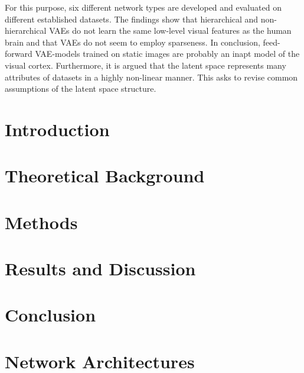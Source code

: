 \documentclass[11pt,a4paper]{article}
\let\oldsection\section
\renewcommand\section{\clearpage\oldsection}
\newcounter{savepage}
\begin{document}
For this purpose, six different network types are developed and evaluated on different established datasets.
The findings show that hierarchical and non-hierarchical \acp{VAE} do not learn the same low-level visual features as the human brain and that \acp{VAE} do not seem to employ sparseness.
In conclusion, feed-forward \ac{VAE}-models trained on static images are probably an inapt model of the visual cortex.
Furthermore, it is argued that the latent space represents many attributes of data\-sets in a highly non-linear manner.
This asks to revise common assumptions of the latent space structure.
\restoregeometry
\clearpage

\tableofcontents
\newpage
\listoffigures
\newpage
\listoftables
\newpage
{}


\acresetall
\section{Introduction}\label{sec:introduction}


\acresetall
\section{Theoretical Background}\label{sec:theoretical-background}


\acresetall
\section{Methods}\label{sec:methods}


\acresetall
\section{Results and Discussion}\label{sec:results}


\acresetall
\section{Conclusion}\label{sec:conclusion}




\newpage
\printbibliography

\newpage
{}
\setcounter{page}{\thesavepage}

\appendix


\section{Network Architectures}\label{sec:appendix_network_architectures}

\end{document}

